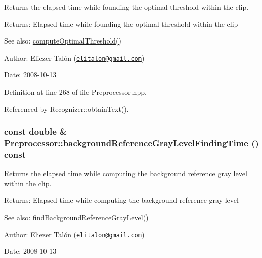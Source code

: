 Returns the elapsed time while founding the optimal threshold within the clip. 

\begin{Desc}
\item[Returns:]Elapsed time while founding the optimal threshold within the clip\end{Desc}
\begin{Desc}
\item[See also:]\hyperlink{class_preprocessor_aaeb94a3b52b835bc26efebb40be25bc}{computeOptimalThreshold()}\end{Desc}
\begin{Desc}
\item[Author:]Eliezer Talón (\href{mailto:elitalon@gmail.com}{\tt elitalon@gmail.com}) \end{Desc}
\begin{Desc}
\item[Date:]2008-10-13 \end{Desc}


Definition at line 268 of file Preprocessor.hpp.

Referenced by Recognizer::obtainText().\hypertarget{class_preprocessor_2cb04f2116b4afc783ff070026bc1297}{
\subsubsection[backgroundReferenceGrayLevelFindingTime]{\setlength{\rightskip}{0pt plus 5cm}const double \& Preprocessor::backgroundReferenceGrayLevelFindingTime () const}}
\label{class_preprocessor_2cb04f2116b4afc783ff070026bc1297}


Returns the elapsed time while computing the background reference gray level within the clip. 

\begin{Desc}
\item[Returns:]Elapsed time while computing the background reference gray level\end{Desc}
\begin{Desc}
\item[See also:]\hyperlink{class_preprocessor_a941f81382bd8e235e4dd12481342be4}{findBackgroundReferenceGrayLevel()}\end{Desc}
\begin{Desc}
\item[Author:]Eliezer Talón (\href{mailto:elitalon@gmail.com}{\tt elitalon@gmail.com}) \end{Desc}
\begin{Desc}
\item[Date:]2008-10-13 \end{Desc}



